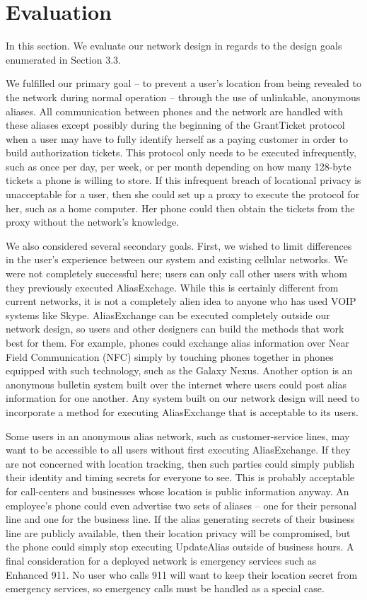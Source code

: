 \documentclass[11pt]{article}
\begin{document}
\section{Evaluation}
In this section. We evaluate our network design in regards to the design goals enumerated in Section 3.3. 

We fulfilled our primary goal -- to prevent a user's location from being revealed to the network during normal operation -- through the use of unlinkable, anonymous aliases. All communication between phones and the network are handled with these aliases except possibly during the beginning of the GrantTicket protocol when a user may have to fully identify herself as a paying customer in order to build authorization tickets. This protocol only needs to be executed infrequently, such as once per day, per week, or per month depending on how many 128-byte tickets a phone is willing to store. If this infrequent breach of locational privacy is unacceptable for a user, then she could set up a proxy to execute the protocol for her, such as a home computer. Her phone could then obtain the tickets from the proxy without the network's knowledge.

We also considered several secondary goals. First, we wished to limit differences in the user's experience between our system and existing cellular networks. We were not completely successful here; users can only call other users with whom they previously executed AliasExchage. While this is certainly different from current networks, it is not a completely alien idea to anyone who has used VOIP systems like Skype. AliasExchange can be executed completely outside our network design, so users and other designers can build the methods that work best for them. For example, phones could exchange alias information over Near Field Communication (NFC) simply by touching phones together in phones equipped with such technology, such as the Galaxy Nexus. Another option is an anonymous bulletin system built over the internet where users could post alias information for one another. Any system built on our network design will need to incorporate a method for executing AliasExchange that is acceptable to its users.

Some users in an anonymous alias network, such as customer-service lines, may want to be accessible to all users without first executing AliasExchange. If they are not concerned with location tracking, then such parties could simply publish their identity and timing secrets for everyone to see. This is probably acceptable for call-centers and businesses whose location is public information anyway. An employee's phone could even advertise two sets of aliases -- one for their personal line and one for the business line. If the alias generating secrets of their business line are publicly available, then their location privacy will be compromised, but the phone could simply stop executing UpdateAlias outside of business hours. A final consideration for a deployed network is emergency services such as Enhanced 911. No user who calls 911 will want to keep their location secret from emergency services, so emergency calls must be handled as a special case.
\end{document}
